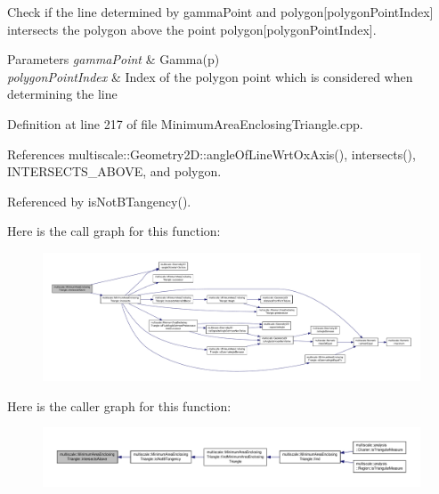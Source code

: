 Check if the line determined by gamma\-Point and polygon\mbox{[}polygon\-Point\-Index\mbox{]} intersects the polygon above the point polygon\mbox{[}polygon\-Point\-Index\mbox{]}. 


\begin{DoxyParams}{Parameters}
{\em gamma\-Point} & Gamma(p) \\
\hline
{\em polygon\-Point\-Index} & Index of the polygon point which is considered when determining the line \\
\hline
\end{DoxyParams}


Definition at line 217 of file Minimum\-Area\-Enclosing\-Triangle.\-cpp.



References multiscale\-::\-Geometry2\-D\-::angle\-Of\-Line\-Wrt\-Ox\-Axis(), intersects(), I\-N\-T\-E\-R\-S\-E\-C\-T\-S\-\_\-\-A\-B\-O\-V\-E, and polygon.



Referenced by is\-Not\-B\-Tangency().



Here is the call graph for this function\-:\nopagebreak
\begin{figure}[H]
\begin{center}
\leavevmode
\includegraphics[width=350pt]{classmultiscale_1_1MinimumAreaEnclosingTriangle_a4d0a39f0a938817b6b07985f6f85da9c_cgraph}
\end{center}
\end{figure}




Here is the caller graph for this function\-:\nopagebreak
\begin{figure}[H]
\begin{center}
\leavevmode
\includegraphics[width=350pt]{classmultiscale_1_1MinimumAreaEnclosingTriangle_a4d0a39f0a938817b6b07985f6f85da9c_icgraph}
\end{center}
\end{figure}


